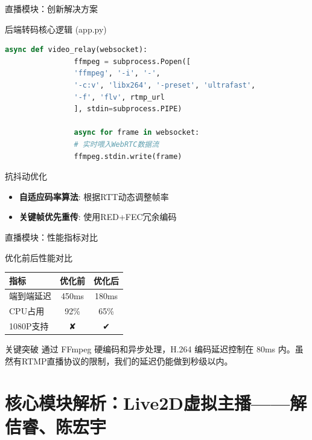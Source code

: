 \documentclass{beamer}
\begin{document}
	\begin{frame}[fragile]{直播模块：创新解决方案}
		\begin{block}{后端转码核心逻辑 (app.py)}
			\begin{lstlisting}[language=Python]
				async def video_relay(websocket):
				ffmpeg = subprocess.Popen([
				'ffmpeg', '-i', '-', 
				'-c:v', 'libx264', '-preset', 'ultrafast',
				'-f', 'flv', rtmp_url
				], stdin=subprocess.PIPE)
				
				async for frame in websocket:
				# 实时喂入WebRTC数据流
				ffmpeg.stdin.write(frame)
			\end{lstlisting}
		\end{block}
		
		\begin{block}{抗抖动优化}
			\begin{itemize}
				\item \textbf{自适应码率算法}: 根据RTT动态调整帧率
				\item \textbf{关键帧优先重传}: 使用RED+FEC冗余编码
			\end{itemize}
		\end{block}
	\end{frame}
	
	\begin{frame}{直播模块：性能指标对比}
		\begin{block}{优化前后性能对比}
			\centering
			\begin{tabular}{lcc}
				\toprule
				\textbf{指标} & \textbf{优化前} & \textbf{优化后} \\
				\midrule
				端到端延迟 & 450ms & \color{green!70!black}180ms \\
				CPU占用    & 92\%   & \color{green!70!black}65\% \\
				1080P支持  & ✘      & \color{green!70!black}✔ \\
				\bottomrule
			\end{tabular}
		\end{block}
		\begin{alertblock}{关键突破}
			通过 FFmpeg 硬编码和异步处理，H.264 编码延迟控制在 80ms 内。虽然有RTMP直播协议的限制，我们的延迟仍能做到秒级以内。
		\end{alertblock}
	\end{frame}
	
	\section{核心模块解析：Live2D虚拟主播——解佶睿、陈宏宇}
	
\end{document}
